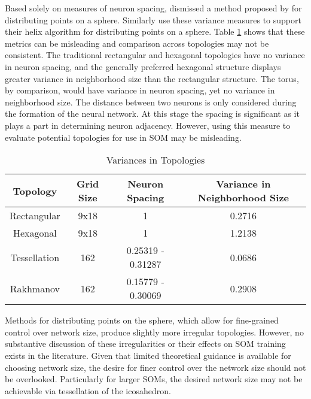 Based solely on measures of neuron spacing, \cite{wu2005} dismissed a method
proposed by \cite{Rakhmanov94} for distributing points on a sphere.  Similarly
\cite{Nishio:2006fk} use these variance measures to support their helix
algorithm for distributing points on a sphere.  Table \ref{table1} shows that
these metrics can be misleading and comparison across topologies may not be
consistent.
The traditional rectangular and hexagonal topologies have no variance in neuron
spacing, and the generally preferred hexagonal structure displays greater
variance in neighborhood size than the rectangular structure.  The torus, by
comparison, would have variance in neuron spacing, yet no variance in
neighborhood size.  The distance between two neurons is only considered during
the formation of the neural network.  At this stage the spacing is significant
as it plays a part in determining neuron adjacency. However, using this measure
to evaluate potential topologies for use in SOM may be misleading.

\begin{table}[htbp]
\caption{Variances in Topologies}
\begin{center}
\begin{tabular}{|c|c|c|c|}
\hline
Topology&Grid Size&Neuron Spacing&Variance in Neighborhood Size\\
\hline
Rectangular&9x18&1&0.2716\\
Hexagonal&9x18&1&1.2138\\
Tessellation&162&0.25319 - 0.31287& 0.0686\\
Rakhmanov&162&0.15779 - 0.30069& 0.2908\\
\hline
\end{tabular}
\end{center}
\label{table1}
\end{table}

Methods for distributing points on the sphere, which allow for fine-grained
control over network size, produce slightly more irregular topologies.  However,
no substantive discussion of these irregularities or their effects on SOM
training exists in the literature. Given that limited theoretical guidance is available
for choosing network size, the desire for finer control over the network size
should not be overlooked. Particularly for larger SOMs, the desired network size
may not be achievable via tessellation of the icosahedron.

